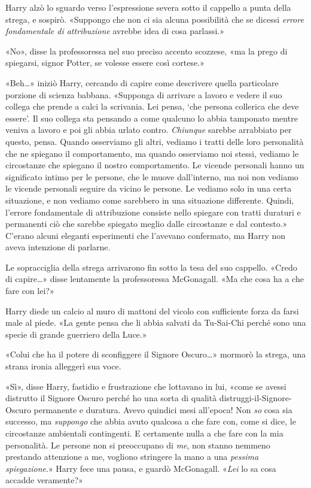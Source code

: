 Harry alzò lo sguardo verso l’espressione severa sotto il cappello a punta della strega, e sospirò. «Suppongo che non ci sia alcuna possibilità che se dicessi \textit{errore fondamentale di attribuzione} avrebbe idea di cosa parlassi.»

«No», disse la professoressa nel suo preciso accento scozzese, «ma la prego di spiegarsi, signor Potter, se volesse essere così cortese.»

«Beh…» iniziò Harry, cercando di capire come descrivere quella particolare porzione di scienza babbana. «Supponga di arrivare a lavoro e vedere il suo collega che prende a calci la scrivania. Lei pensa, ‘che persona collerica che deve essere’. Il suo collega sta pensando a come qualcuno lo abbia tamponato mentre veniva a lavoro e poi gli abbia urlato contro. \textit{Chiunque} sarebbe arrabbiato per questo, pensa. Quando osserviamo gli altri, vediamo i tratti delle loro personalità che ne spiegano il comportamento, ma quando osserviamo noi stessi, vediamo le circostanze che spiegano il nostro comportamento. Le vicende personali hanno un significato intimo per le persone, che le muove dall’interno, ma noi non vediamo le vicende personali seguire da vicino le persone. Le vediamo solo in una certa situazione, e non vediamo come sarebbero in una situazione differente. Quindi, l’errore fondamentale di attribuzione consiste nello spiegare con tratti duraturi e permanenti ciò che sarebbe spiegato meglio dalle circostanze e dal contesto.» C’erano alcuni eleganti esperimenti che l’avevano confermato, ma Harry non aveva intenzione di parlarne.

Le sopracciglia della strega arrivarono fin sotto la tesa del suo cappello. «Credo di capire…» disse lentamente la professoressa McGonagall. «Ma che cosa ha a che fare con lei?»

Harry diede un calcio al muro di mattoni del vicolo con sufficiente forza da farsi male al piede. «La gente pensa che li abbia salvati da Tu-Sai-Chi perché sono una specie di grande guerriero della Luce.»

«Colui che ha il potere di sconfiggere il Signore Oscuro…» mormorò la strega, una strana ironia alleggerì sua voce.

«Sì», disse Harry, fastidio e frustrazione che lottavano in lui, «come se avessi distrutto il Signore Oscuro perché ho una sorta di qualità distruggi-il-Signore-Oscuro permanente e duratura. Avevo quindici mesi all’epoca! Non \textit{so} cosa sia successo, ma \textit{suppongo} che abbia avuto qualcosa a che fare con, come si dice, le circostanze ambientali contingenti. E certamente nulla a che fare con la mia personalità. Le persone non si preoccupano di \textit{me}, non stanno nemmeno prestando attenzione a me, vogliono stringere la mano a una \textit{pessima spiegazione}.» Harry fece una pausa, e guardò McGonagall. «\textit{Lei} lo sa cosa accadde veramente?»

